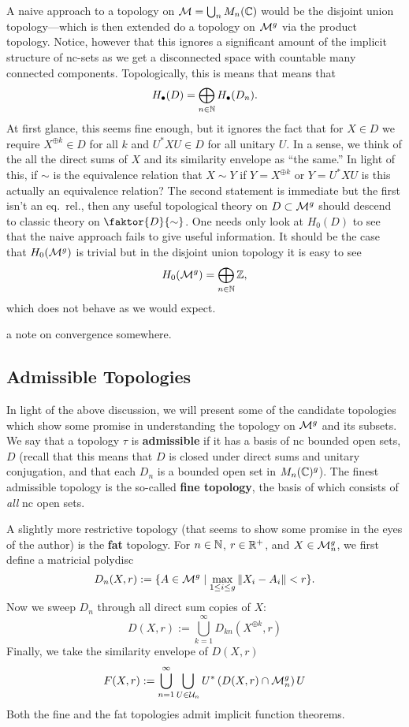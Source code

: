 A naive approach to a topology on \(\mathcal{M} = \bigcup_n M_n(\mathbb{C})\) would be the
disjoint union topology---which is then extended do a topology on \(\mathcal{M}^g\) via
the product topology. Notice, however that this ignores a significant amount of
the implicit structure of nc-sets as we get a disconnected space with countable
many connected components. Topologically, this is means that means that
\[
  H_\bullet (D) = \bigoplus_{n \in \mathbb{N} } H_\bullet(D_n).
\]
At first glance, this seems fine enough, but it ignores the fact that for
\(X \in D\) we require \(X^{\oplus k} \in D\) for all \(k\) and \(U^*XU \in D\)
for all unitary \(U\). In a sense, we think of the all the direct sums of \(X\)
and its similarity envelope as ``the same.'' In light of this, if \(\sim\) is
the equivalence relation that \(X\sim Y\) if \(Y = X^{\oplus k}\) or
\(Y = U^*XU\) {\color{red} is this actually an equivalence relation? The second
statement is immediate but the first isn't an eq.\ rel.},
then any useful topological theory on \(D \subset \mathcal{M}^g\) should descend to
classic theory on \(\faktor{D}{\sim}\). One needs only look at \(H_0(D)\) to see
that the naive approach fails to give useful information. It should be the case
that \(H_0(\mathcal{M}^{g} )\) is trivial but in the disjoint union topology it is easy
to see
\[
  H_0(\mathcal{M}^{g} ) = \bigoplus_{n \in \mathbb{N} } \mathbb{Z} ,
\]
which does not behave as we would expect.

{\color{blue} a note on convergence somewhere.}

\subsection{Admissible Topologies}%
\label{sec:admtopo}

In light of the above discussion, we will present some of the candidate
topologies which show some promise in understanding the topology on \(\mathcal{M}^g\)
and its subsets.
We say that a topology \(\tau\) is \textbf{admissible} if it has a basis of nc
bounded open sets, \(D\) (recall that this means that \(D\) is closed under
direct sums and unitary conjugation, and that each \(D_n\) is a bounded open set
in \(M_n(\mathbb{C})^g\)). The finest admissible topology is the so-called \textbf{fine
  topology},
the basis of which consists of \emph{all} nc open sets.

A slightly more restrictive topology (that seems to show some promise in the eyes
of the author) is the \textbf{fat} topology. For \(n \in \mathbb{N} \),
\(r \in \mathbb{R} ^+\), and \(X \in \mathcal{M}^g_n\), we first define a matricial polydisc
\[
  D_n(X,r) := \{A \in \mathcal{M}^g \mid \max_{1\leq i\leq g} \| X_i-A_i \| <r\}.
\]
Now we sweep \(D_n\) through all direct sum copies of \(X\):
\[
  D(X,r) := \bigcup_{k=1}^\infty D_{kn} (X^{\oplus k},r)
\]
Finally, we take the similarity envelope of \(D(X,r)\)
\[
  F(X,r) :=  \bigcup_{n=1}^\infty \bigcup_{U \in \mathcal{U}_n} U^* \left( D(X,r) \cap \mathcal{M}^g_n \right) U
\]
Both the fine and the fat topologies admit implicit function theorems.

